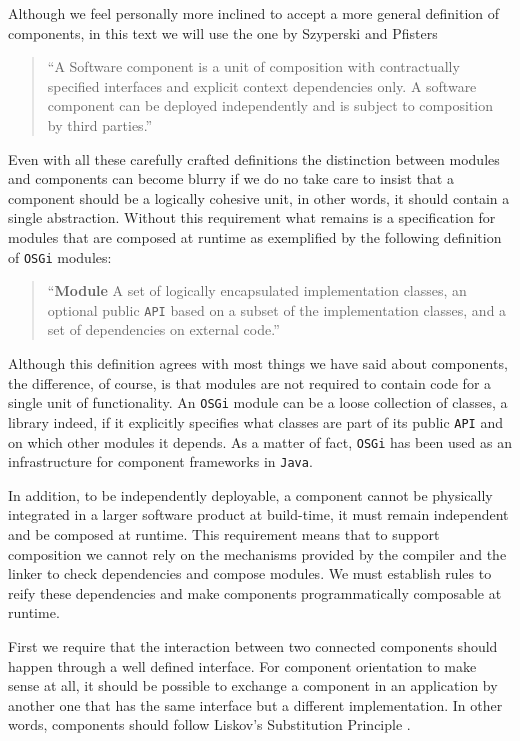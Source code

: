 Although we feel personally more inclined to accept a more general definition of components, in this text we will use the one by Szyperski and Pfisters \cite{WCOP97}

\begin{quotation}
``A Software component is a unit of composition with contractually specified interfaces and explicit context dependencies only.
A software component can be deployed independently and is subject to composition by third parties.''
\end{quotation}

Even with all these carefully crafted definitions the distinction between modules and components can become blurry if
we do no take care to insist that a component should be a logically cohesive unit, in other words, it should contain
a single abstraction. Without this requirement what remains is a specification for modules that are composed at runtime 
as exemplified by the following definition of \texttt{OSGi} modules: \cite{Hall}

\begin{quotation}
``\textbf{Module} A set of logically encapsulated implementation classes, an optional public \texttt{API} based on a subset
of the implementation classes, and a set of dependencies on external code.''
\end{quotation}

Although this definition agrees with most things we have said about components, the difference, of course, is that modules
are not required to contain code for a single unit of functionality. An \texttt{OSGi} module can be a loose collection of
classes, a library indeed, if it explicitly specifies what classes are part of its public \texttt{API} and on which other
modules it depends. As a matter of fact, \texttt{OSGi} has been used as an infrastructure for component frameworks in \texttt{Java}.

In addition, to be independently deployable, a component cannot be physically integrated in a larger software product at build-time,
it must remain independent and be composed at runtime. This requirement means that to support composition we cannot rely on the
mechanisms provided by the compiler and the linker to check dependencies and compose modules. We must establish rules to reify these
dependencies and make components programmatically composable at runtime. 

First we require that the interaction between two connected components should happen through a well defined interface.
For component orientation to make sense at all, it should be possible to exchange a component in an application by another
one that has the same interface but a different implementation. In other words, components should follow Liskov's
Substitution Principle \cite{Liskov}.

